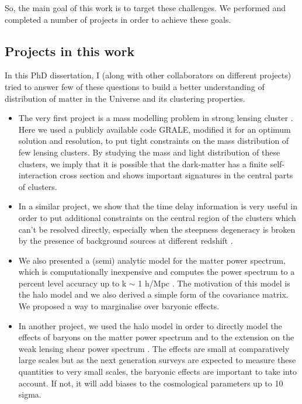 So, the main goal of this work is to target these challenges. We performed and completed
a number of projects in order to achieve these goals. 


\subsection{Projects in this work}

In this PhD dissertation, I (along with other collaborators on different projects) tried
to answer few of these questions to build a better understanding of distribution of 
matter in the Universe and its clustering properties. 

\begin{itemize}
\item	The very first project is a mass modelling problem in strong lensing cluster
	\cite{2014MNRAS.439.2651M}. Here we
	used a publicly available code GRALE, modified it for an optimum solution and resolution,
	to put tight constraints on the mass distribution of few lensing clusters. By studying
	the mass and light distribution of these clusters, we imply that it is possible 
	that the dark-matter has a finite self-interaction cross section and shows
	important signatures in the central parts of clusters. 

\item	In a similar project, we show that the time delay information is very useful in 
	order to put additional constraints on the central region of the clusters which can't 
	be resolved directly, especially when the steepness degeneracy is broken by the 
	presence of background sources at different redshift \cite{2015PASJ...67...21M}.

\item	We also presented a (semi) analytic model for the matter power spectrum, which is
	computationally inexpensive and computes the power spectrum to a percent level 
	accuracy up to k $\sim$ 1 h/Mpc \cite{2014MNRAS.445.3382M}. 
	The motivation of this model is the halo model
	and we also derived a simple form of the covariance matrix. We proposed a way to 
	marginalise over baryonic effects. 

\item	In another project, we used the halo model in order to directly
	model the effects of baryons on the matter power spectrum and to the extension on the
	weak lensing shear power spectrum \cite{2014arXiv1410.6826M}. 
	The effects are small at comparatively large
	scales but as the next generation surveys are expected to measure these quantities 
	to very small scales, the baryonic effects are important to take into account. If not, 
	it will add biases to the cosmological parameters up to 10 sigma. 

\end{itemize}

